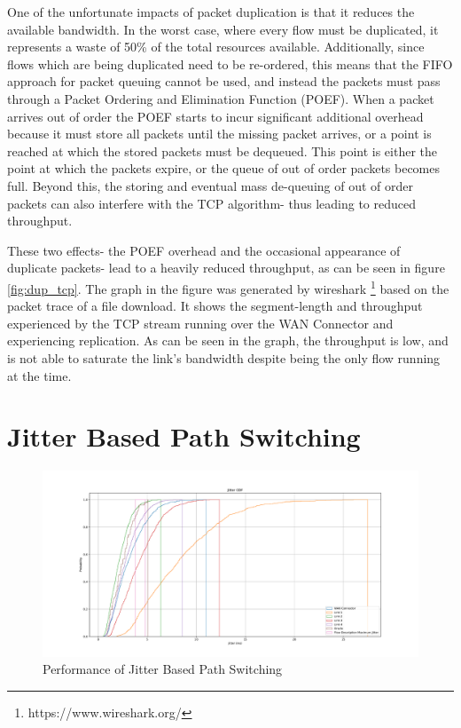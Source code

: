One of the unfortunate impacts of packet duplication is that it reduces the available bandwidth. In the worst case, where every flow must be duplicated, it represents a waste of 50\% of the total resources available. Additionally, since flows which are being duplicated need to be re-ordered, this means that the FIFO approach for packet queuing cannot be used, and instead the packets must pass through a Packet Ordering and Elimination Function (POEF). When a packet arrives out of order the POEF starts to incur significant additional overhead because it must store all packets until the missing packet arrives, or a point is reached at which the stored packets must be dequeued. This point is either the point at which the packets expire, or the queue of out of order packets becomes full. Beyond this, the storing and eventual mass de-queuing of out of order packets can also interfere with the TCP algorithm- thus leading to reduced throughput.

These two effects- the POEF overhead and the occasional appearance of duplicate packets- lead to a heavily reduced throughput, as can be seen in figure \ref{fig:dup_tcp}. The graph in the figure was generated by wireshark \footnote{https://www.wireshark.org/} based on the packet trace of a file download. It shows the segment-length and throughput experienced by the TCP stream running over the WAN Connector and experiencing replication. As can be seen in the graph, the throughput is low, and is not able to saturate the link's bandwidth despite being the only flow running at the time.

\section{Jitter Based Path Switching}

\begin{figure}[h]
    \centering
        \includegraphics[height=0.66\textwidth,width=\textwidth]{fig/jitter_cdf.pdf}
        \caption{Performance of Jitter Based Path Switching}
        \label{fig:jitter_cdf}
\end{figure}

